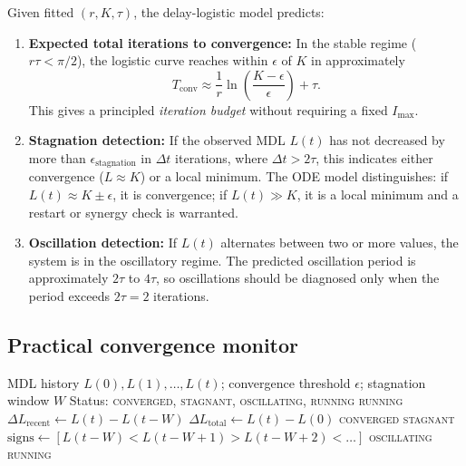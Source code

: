 \documentclass[11pt]{article}
\begin{document}
Given fitted $(r, K, \tau)$, the delay-logistic model predicts:
\begin{enumerate}
  \item \textbf{Expected total iterations to convergence:} In the stable regime ($r\tau < \pi/2$), the logistic curve reaches within $\epsilon$ of $K$ in approximately
  \begin{equation}
    T_{\text{conv}} \approx \frac{1}{r} \ln\left(\frac{K - \epsilon}{\epsilon}\right) + \tau.
  \end{equation}
  This gives a principled \emph{iteration budget} without requiring a fixed $I_{\max}$.

  \item \textbf{Stagnation detection:} If the observed MDL $L(t)$ has not decreased by more than $\epsilon_{\text{stagnation}}$ in $\Delta t$ iterations, where $\Delta t > 2\tau$, this indicates either convergence ($L \approx K$) or a local minimum.  The ODE model distinguishes: if $L(t) \approx K \pm \epsilon$, it is convergence; if $L(t) \gg K$, it is a local minimum and a restart or synergy check is warranted.

  \item \textbf{Oscillation detection:} If $L(t)$ alternates between two or more values, the system is in the oscillatory regime.  The predicted oscillation period is approximately $2\tau$ to $4\tau$, so oscillations should be diagnosed only when the period exceeds $2\tau = 2$ iterations.
\end{enumerate}

\subsection{Practical convergence monitor}

\begin{algorithm}
\caption{ODE-based convergence monitor}
\label{alg:ode-monitor}
\begin{algorithmic}[1]
\Require MDL history $L(0), L(1), \ldots, L(t)$; convergence threshold $\epsilon$; stagnation window $W$
\Ensure Status: \textsc{converged}, \textsc{stagnant}, \textsc{oscillating}, \textsc{running}
  \State \Return \textsc{running} 
\EndIf
\State $\Delta L_{\text{recent}} \gets L(t) - L(t - W)$
\State $\Delta L_{\text{total}} \gets L(t) - L(0)$
  \State \Return \textsc{converged} 
  \State \Return \textsc{stagnant} 
\EndIf
\State $\text{signs} \gets [L(t-W) < L(t-W+1) > L(t-W+2) < \ldots]$ 
  \State \Return \textsc{oscillating}
\EndIf
\State \Return \textsc{running}
\end{algorithmic}
\end{algorithm}
\end{document}
